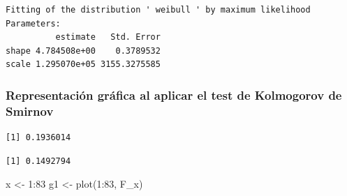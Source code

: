 \documentclass[
  us-letterpaper,
]{scrreprt}
\newenvironment{Shaded}{\begin{snugshade}}{\end{snugshade}}
\newcommand{\AttributeTok}[1]{\textcolor[rgb]{0.40,0.45,0.13}{#1}}
\newcommand{\CommentTok}[1]{\textcolor[rgb]{0.37,0.37,0.37}{#1}}
\newcommand{\ConstantTok}[1]{\textcolor[rgb]{0.56,0.35,0.01}{#1}}
\newcommand{\ControlFlowTok}[1]{\textcolor[rgb]{0.00,0.23,0.31}{\textbf{#1}}}
\newcommand{\DecValTok}[1]{\textcolor[rgb]{0.68,0.00,0.00}{#1}}
\newcommand{\FloatTok}[1]{\textcolor[rgb]{0.68,0.00,0.00}{#1}}
\newcommand{\FunctionTok}[1]{\textcolor[rgb]{0.28,0.35,0.67}{#1}}
\newcommand{\NormalTok}[1]{\textcolor[rgb]{0.00,0.23,0.31}{#1}}
\newcommand{\OtherTok}[1]{\textcolor[rgb]{0.00,0.23,0.31}{#1}}
\newcommand{\SpecialCharTok}[1]{\textcolor[rgb]{0.37,0.37,0.37}{#1}}
\theoremstyle{plain}
\theoremstyle{plain}
\theoremstyle{definition}
\theoremstyle{remark}
\begin{document}
\begin{verbatim}
Fitting of the distribution ' weibull ' by maximum likelihood 
Parameters:
          estimate   Std. Error
shape 4.784508e+00    0.3789532
scale 1.295070e+05 3155.3275585
\end{verbatim}

\begin{Shaded}
\end{Shaded}

\subsubsection{Representación gráfica al aplicar el test de Kolmogorov
de
Smirnov}\label{representaciuxf3n-gruxe1fica-al-aplicar-el-test-de-kolmogorov-de-smirnov}

\begin{verbatim}
[1] 0.1936014
\end{verbatim}

\begin{verbatim}
[1] 0.1492794
\end{verbatim}

\begin{Shaded}
\begin{Highlighting}[]
\NormalTok{x }\OtherTok{\textless{}{-}} \DecValTok{1}\SpecialCharTok{:}\DecValTok{83} 
\NormalTok{g1 }\OtherTok{\textless{}{-}} \FunctionTok{plot}\NormalTok{(}\DecValTok{1}\SpecialCharTok{:}\DecValTok{83}\NormalTok{, F\_x) }
\end{Highlighting}
\end{Shaded}
\end{document}
